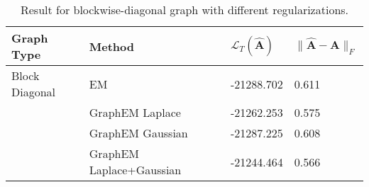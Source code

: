 \begin{table}[tb]
\caption{Result for blockwise-diagonal graph with different regularizations.}
\label{tab: prior results for block-diag}
\begin{tabular}{llll}
\toprule
\textbf{Graph Type} & \textbf{Method} & \textbf{$\mathcal{L}_T(\widehat{\mathbf{A}})$} & \textbf{$\| \widehat{\mathbf{A}} - \mathbf{A} \|_F$} \\
\midrule
Block Diagonal & EM & -21288.702 & 0.611 \\
 & GraphEM Laplace & -21262.253 & 0.575 \\
 & GraphEM Gaussian & -21287.225 & 0.608 \\
 & GraphEM Laplace+Gaussian & -21244.464 & 0.566 \\
\bottomrule
\end{tabular}
\end{table}
